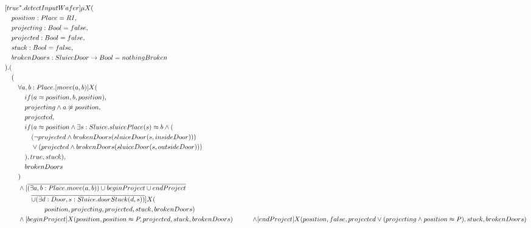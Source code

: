 \begin{description}
	\begin{align*}
& [true^*.detectInputWafer] \mu X( \\
&          \tab                          position: Place = RI,    \\  
&          \tab                          projecting: Bool = false,  \\
&          \tab                          projected: Bool = false,   \\
&          \tab                          stuck: Bool = false,       \\
&          \tab                          brokenDoors: SluiceDoor \to Bool = nothingBroken   \\
&                                 ).( \\
&  \tab ( \\
&  \tab\tab  \forall a,b:Place.[move(a,b)]X( \\
&  \tab\tab  \tab                              if(a \approx position, b, position), \\
&  \tab\tab  \tab                              projecting \wedge a \not \approx position, \\
&  \tab\tab  \tab                              projected, \\
&  \tab\tab  \tab                              if(a \approx position \wedge \exists s:Sluice . sluicePlace(s) \approx b \wedge ( \\
& \tab\tab\tab\tab (\neg projected \wedge brokenDoors(sluiceDoor(s, insideDoor))) \\ 
& \tab\tab\tab\tab \vee (projected \wedge brokenDoors(sluiceDoor(s, outsideDoor))) \\
& \tab\tab\tab ), true, stuck), \\
&  \tab\tab  \tab                              brokenDoors \\
&  \tab\tab                               ) \\
&  \tab\tab  \wedge [\overline{(\exists a,b:Place.move(a,b)) \cup beginProject \cup endProject} \\
& \tab\tab\tab\tab \overline{ \cup (\exists d:Door,s:Sluice.doorStuck(d, s))}]X( \\
& \tab\tab\tab\tab\tab\tab position, projecting, projected, stuck, brokenDoors) \\
&  \tab\tab  \wedge [beginProject]X(position, position \approx P, projected, stuck, brokenDoors)
&  \tab\tab  \wedge [endProject]X(position, false, projected \vee (projecting \wedge position \approx P), stuck, brokenDoors) \\

\end{align*}
\end{description}

